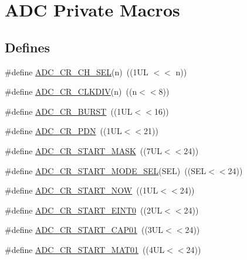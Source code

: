 \hypertarget{group___a_d_c___private___macros}{\section{\-A\-D\-C \-Private \-Macros}
\label{group___a_d_c___private___macros}
}
\subsection*{\-Defines}
\begin{DoxyCompactItemize}
\item 
\#define \hyperlink{group___a_d_c___private___macros_ga3a6629b2190324c0b6abafc4b720df2e}{\-A\-D\-C\-\_\-\-C\-R\-\_\-\-C\-H\-\_\-\-S\-E\-L}(n)~((1\-U\-L $<$$<$ n))
\item 
\#define \hyperlink{group___a_d_c___private___macros_gad2327ec652bedf37c800e077cc46d904}{\-A\-D\-C\-\_\-\-C\-R\-\_\-\-C\-L\-K\-D\-I\-V}(n)~((n$<$$<$8))
\item 
\#define \hyperlink{group___a_d_c___private___macros_gac4274c705620f3ddd5ba7f73249e6248}{\-A\-D\-C\-\_\-\-C\-R\-\_\-\-B\-U\-R\-S\-T}~((1\-U\-L$<$$<$16))
\item 
\#define \hyperlink{group___a_d_c___private___macros_ga7474e4ab5695434acbfe8a5fcad35ef0}{\-A\-D\-C\-\_\-\-C\-R\-\_\-\-P\-D\-N}~((1\-U\-L$<$$<$21))
\item 
\#define \hyperlink{group___a_d_c___private___macros_gadb696eab756362a8e2dbc5502f8bdeaf}{\-A\-D\-C\-\_\-\-C\-R\-\_\-\-S\-T\-A\-R\-T\-\_\-\-M\-A\-S\-K}~((7\-U\-L$<$$<$24))
\item 
\#define \hyperlink{group___a_d_c___private___macros_ga1af437f22df0b2b07bef704b23733874}{\-A\-D\-C\-\_\-\-C\-R\-\_\-\-S\-T\-A\-R\-T\-\_\-\-M\-O\-D\-E\-\_\-\-S\-E\-L}(\-S\-E\-L)~((\-S\-E\-L$<$$<$24))
\item 
\#define \hyperlink{group___a_d_c___private___macros_gad9f225e8d5f50609888edab56cd0da5c}{\-A\-D\-C\-\_\-\-C\-R\-\_\-\-S\-T\-A\-R\-T\-\_\-\-N\-O\-W}~((1\-U\-L$<$$<$24))
\item 
\#define \hyperlink{group___a_d_c___private___macros_gac821b0162480d224ff928bf834bcb431}{\-A\-D\-C\-\_\-\-C\-R\-\_\-\-S\-T\-A\-R\-T\-\_\-\-E\-I\-N\-T0}~((2\-U\-L$<$$<$24))
\item 
\#define \hyperlink{group___a_d_c___private___macros_ga4e02749175edb9417c4a7961b2d4e4c9}{\-A\-D\-C\-\_\-\-C\-R\-\_\-\-S\-T\-A\-R\-T\-\_\-\-C\-A\-P01}~((3\-U\-L$<$$<$24))
\item 
\#define \hyperlink{group___a_d_c___private___macros_ga4accee65c727e3ba2e188617109ad01e}{\-A\-D\-C\-\_\-\-C\-R\-\_\-\-S\-T\-A\-R\-T\-\_\-\-M\-A\-T01}~((4\-U\-L$<$$<$24))

\end{DoxyCompactItemize}
